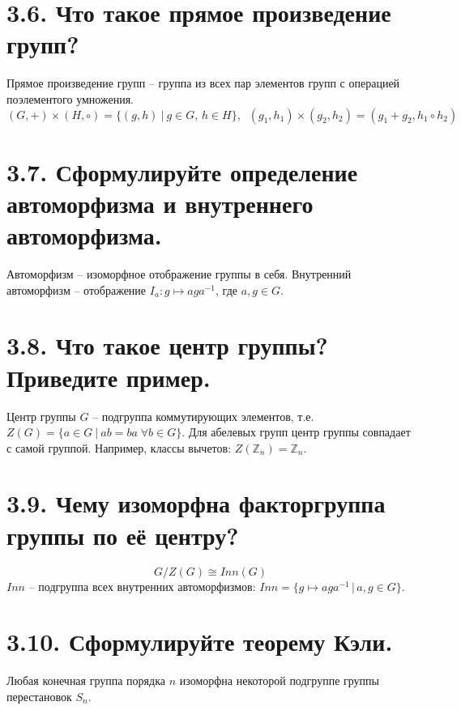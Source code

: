 \documentclass{article}
\begin{document}
\section*{\LARGE 3.6. Что такое прямое произведение групп?}
Прямое произведение групп -- группа из всех пар элементов групп с операцией поэлементого умножения.
$$(G, +) \times (H, \circ) = \{(g, h) \:|\: g \in G,\, h \in H\},\;\; (g_1, h_1)\times(g_2, h_2) = (g_1 + g_2, h_1 \circ h_2)$$

\section*{\LARGE 3.7. Сформулируйте определение автоморфизма и внутреннего автоморфизма. }
Автоморфизм -- изоморфное отображение группы в себя. Внутренний автоморфизм -- отображение $I_a : g \mapsto aga^{-1}$, где $a,g \in G$.

\section*{\LARGE 3.8. Что такое центр группы? Приведите пример. }
Центр группы $G$ -- подгруппа коммутирующих элементов, т.е. 
\newline $Z(G) = \{a \in G \:|\: ab = ba \; \forall b \in G\}$.
\newline Для абелевых групп центр группы совпадает с самой группой. Например, 
\newline классы вычетов: $Z(\mathbb{Z}_n) = \mathbb{Z}_n$.

\section*{\LARGE 3.9. Чему изоморфна факторгруппа группы по её центру? }
$$G/Z(G) \cong Inn(G)$$
$Inn$ -- подгруппа всех внутренних автоморфизмов: $Inn = \{g \mapsto aga^{-1}\,|\, a,g \in G\}$.

\section*{\LARGE 3.10. Сформулируйте теорему Кэли. }
Любая конечная группа порядка $n$ изоморфна некоторой подгруппе группы перестановок $S_n$.
\end{document}
